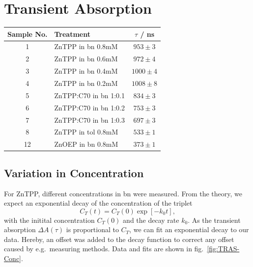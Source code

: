 \section{Transient Absorption}
\label{sec:TRAS}


\begin{table}[ht]
    \centering
    \begin{tabular}{clc}
        \toprule
        Sample No. &    Treatment &    $\tau$ / \si{\nano\second} \\
        \midrule
        1 &     ZnTPP in bn 0.8mM &  $953 \pm 3$ \\
        2 &     ZnTPP in bn 0.6mM &  $972 \pm 4$ \\
        3 &     ZnTPP in bn 0.4mM & $1000 \pm 4$ \\
        4 &     ZnTPP in bn 0.2mM & $1008 \pm 8$ \\
        5 & ZnTPP:C70 in bn 1:0.1 &  $834 \pm 3$ \\
        6 & ZnTPP:C70 in bn 1:0.2 &  $753 \pm 3$ \\
        7 & ZnTPP:C70 in bn 1:0.3 &  $697 \pm 3$ \\
        8 &    ZnTPP in tol 0.8mM &  $533 \pm 1$ \\
        12 &     ZnOEP in bn 0.8mM &  $373 \pm 1$\\
        \bottomrule
    \end{tabular}
\end{table}



\subsection*{Variation in Concentration}
For ZnTPP, different concentrations in bn were measured. From the theory, we expect an exponential decay of the concentration of the triplet 
\begin{equation}
    C_T(t) = C_T(0) \exp[-k_0t],
\end{equation}
with the initital concentration $C_T(0)$ and the decay rate $k_0$.
As the transient absorption $\Delta A(\tau)$ is proportional to $C_T$, we can fit an exponential decay to our data. Hereby, an offset was added to the decay function to correct any offset caused by e.g.~measuring methods. Data and fits are shown in fig.~\ref{fig:TRAS-Conc}.

